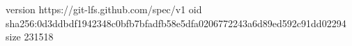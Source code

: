 version https://git-lfs.github.com/spec/v1
oid sha256:0d3ddbdf1942348c0bfb7bfadfb58e5dfa0206772243a6d89ed592c91dd02294
size 231518
